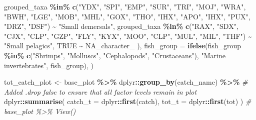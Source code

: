 \documentclass[
]{book}
\newenvironment{Shaded}{\begin{snugshade}}{\end{snugshade}}
\newcommand{\AttributeTok}[1]{\textcolor[rgb]{0.13,0.29,0.53}{#1}}
\newcommand{\CommentTok}[1]{\textcolor[rgb]{0.56,0.35,0.01}{\textit{#1}}}
\newcommand{\ConstantTok}[1]{\textcolor[rgb]{0.56,0.35,0.01}{#1}}
\newcommand{\FunctionTok}[1]{\textcolor[rgb]{0.13,0.29,0.53}{\textbf{#1}}}
\newcommand{\NormalTok}[1]{#1}
\newcommand{\OtherTok}[1]{\textcolor[rgb]{0.56,0.35,0.01}{#1}}
\newcommand{\SpecialCharTok}[1]{\textcolor[rgb]{0.81,0.36,0.00}{\textbf{#1}}}
\newcommand{\StringTok}[1]{\textcolor[rgb]{0.31,0.60,0.02}{#1}}
\begin{document}
\begin{Shaded}
\begin{Highlighting}[]
\NormalTok{      grouped\_taxa }\SpecialCharTok{\%in\%} \FunctionTok{c}\NormalTok{(}\StringTok{"YDX"}\NormalTok{, }\StringTok{"SPI"}\NormalTok{, }\StringTok{"EMP"}\NormalTok{, }\StringTok{"SUR"}\NormalTok{, }\StringTok{"TRI"}\NormalTok{, }\StringTok{"MOJ"}\NormalTok{, }\StringTok{"WRA"}\NormalTok{, }\StringTok{"BWH"}\NormalTok{, }\StringTok{"LGE"}\NormalTok{, }\StringTok{"MOB"}\NormalTok{, }\StringTok{"MHL"}\NormalTok{, }\StringTok{"GOX"}\NormalTok{, }\StringTok{"THO"}\NormalTok{, }\StringTok{"IHX"}\NormalTok{, }\StringTok{"APO"}\NormalTok{, }\StringTok{"IHX"}\NormalTok{, }\StringTok{"PUX"}\NormalTok{, }\StringTok{"DRZ"}\NormalTok{, }\StringTok{"DSF"}\NormalTok{) }\SpecialCharTok{\textasciitilde{}} \StringTok{"Small demersals"}\NormalTok{,}
\NormalTok{      grouped\_taxa }\SpecialCharTok{\%in\%} \FunctionTok{c}\NormalTok{(}\StringTok{"RAX"}\NormalTok{, }\StringTok{"SDX"}\NormalTok{, }\StringTok{"CJX"}\NormalTok{, }\StringTok{"CLP"}\NormalTok{, }\StringTok{"GZP"}\NormalTok{, }\StringTok{"FLY"}\NormalTok{, }\StringTok{"KYX"}\NormalTok{, }\StringTok{"MOO"}\NormalTok{, }\StringTok{"CLP"}\NormalTok{, }\StringTok{"MUL"}\NormalTok{, }\StringTok{"MIL"}\NormalTok{, }\StringTok{"THF"}\NormalTok{) }\SpecialCharTok{\textasciitilde{}} \StringTok{"Small pelagics"}\NormalTok{,}
      \ConstantTok{TRUE} \SpecialCharTok{\textasciitilde{}} \ConstantTok{NA\_character\_}
\NormalTok{    ),}
    \AttributeTok{fish\_group =} \FunctionTok{ifelse}\NormalTok{(fish\_group }\SpecialCharTok{\%in\%} \FunctionTok{c}\NormalTok{(}\StringTok{"Shrimps"}\NormalTok{, }\StringTok{"Molluscs"}\NormalTok{, }\StringTok{"Cephalopods"}\NormalTok{, }\StringTok{"Crustaceans"}\NormalTok{), }\StringTok{"Marine invertebrates"}\NormalTok{, fish\_group),}
\NormalTok{  )}

\NormalTok{tot\_catch\_plot }\OtherTok{\textless{}{-}}
\NormalTok{  base\_plot }\SpecialCharTok{\%\textgreater{}\%}
\NormalTok{  dplyr}\SpecialCharTok{::}\FunctionTok{group\_by}\NormalTok{(catch\_name) }\SpecialCharTok{\%\textgreater{}\%} \CommentTok{\# Added .drop false to ensure that all factor levels remain in plot}
\NormalTok{  dplyr}\SpecialCharTok{::}\FunctionTok{summarise}\NormalTok{(}
    \AttributeTok{catch\_t =}\NormalTok{ dplyr}\SpecialCharTok{::}\FunctionTok{first}\NormalTok{(catch),}
    \AttributeTok{tot\_t =}\NormalTok{ dplyr}\SpecialCharTok{::}\FunctionTok{first}\NormalTok{(tot)}
\NormalTok{  )}
\CommentTok{\# base\_plot \%\textgreater{}\% View()}


\end{Highlighting}
\end{Shaded}
\end{document}
